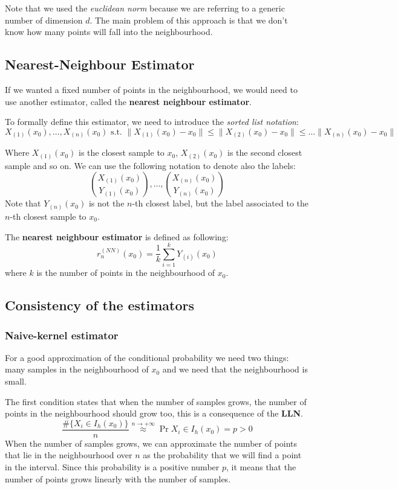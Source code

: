 Note that we used the \textit{euclidean norm} because we are referring to a generic number of dimension $d$. The main problem of this approach is that we don't know how many points will fall into the neighbourhood.

\subsection{Nearest-Neighbour Estimator}
If we wanted a fixed number of points in the neighbourhood, we would need to use another estimator, called the \textbf{nearest neighbour estimator}.

To formally define this estimator, we need to introduce the \textit{sorted list notation}:
\[
    X_{(1)}(x_0), \dots, X_{(n)}(x_0) \text{ s.t. } \lVert X_{(1)}(x_0) - x_0 \rVert \leq \lVert X_{(2)}(x_0) - x_0 \rVert \leq \dots \lVert X_{(n)}(x_0) - x_0 \rVert
\]

Where $X_{(1)}(x_0)$ is the closest sample to $x_0$, $X_{(2)}(x_0)$ is the second closest sample and so on. We can use the following notation to denote also the labels:
\[
    \binom{X_{(1)}(x_0)}{Y_{(1)}(x_0)}, \dots, \binom{X_{(n)}(x_0)}{Y_{(n)}(x_0)}
\]
Note that $Y_{(n)}(x_0)$  is not the $n$-th closest label, but the label associated to the $n$-th closest sample to $x_0$.

\begin{definition}
    The \textbf{nearest neighbour estimator} is defined as following:
    \[
        r_n^{(NN)}(x_0) = \frac{1}{k} \sum_{i=1}^{k} Y_{(i)} (x_0)
    \]
    where $k$ is the number of points in the neighbourhood of $x_0$.
\end{definition}

\subsection{Consistency of the estimators}
\subsubsection{Naive-kernel estimator}
For a good approximation of the conditional probability we need two things: many samples in the neighbourhood of $x_0$ and we need that the neighbourhood is small.

The first condition states that when the number of samples grows, the number of points in the neighbourhood should grow too, this is a consequence of the \textbf{LLN}.
\[
    \frac{\#\{X_i \in I_h(x_0)\}}{n} \stackrel{n \to +\infty}{\approx} \Pr{X_i \in I_h(x_0)} = p > 0
\]
When the number of samples grows, we can approximate the number of points that lie in the neighbourhood over $n$ as the probability that we will find a point in the interval. Since this probability is a positive number $p$, it means that the number of points grows linearly with the number of samples.

